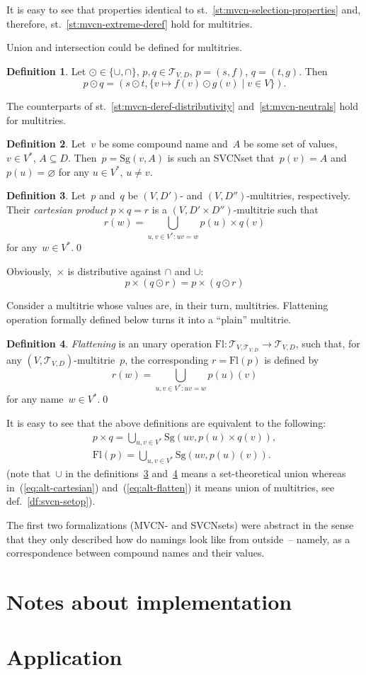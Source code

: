 \documentclass{article}
\theoremstyle{definition}
\newtheorem{Df}{Definition}
\newcommand{\setcharmt}{T}
\newcommand{\setsymbol}[3]{\mathcal{#1}_{#2,#3}}
\newcommand{\setmt}[2]{\setsymbol{\setcharmt}{#1}{#2}}
\newcommand{\flatten}{\mathrm{Fl}}
\newcommand{\singleleaf}{\mathrm{Sg}}
\begin{document}
It is easy to see that properties identical to
st.~\ref{st:mvcn-selection-properties} and, therefore,
st.~\ref{st:mvcn-extreme-deref} hold for multitries.

Union and intersection could be defined for multitries.
\begin{Df}\label{df:mt-setop}
Let $\odot \in \{ \cup, \cap \}$, $p, q \in \setmt{V}{D}$,
$p = (s,f)$, $q = (t, g)$. Then
\[
  p \odot q = (s \odot t, \{ v \mapsto f(v) \odot g(v) \mid v \in V \}) .
\]
\end{Df}

The counterparts of st.~\ref{st:mvcn-deref-distributivity}
and~\ref{st:mvcn-neutrals} hold for multitries.


\begin{Df}
Let~$v$ be some compound name and~$A$ be some set of values, $v\in V^\ast$,
$A\subseteq D$.  Then~$p = \singleleaf(v,A)$ is such an SVCNset that~$p(v) =
A$ and~$p(u) = \varnothing$ for any $u\in V^\ast$, $u\neq v$.
\end{Df}

\begin{Df}\label{df:cartesian}
Let~$p$ and~$q$ be $(V,D')$- and $(V,D'')$-multitries, respectively. Their
\emph{cartesian product} $p\times q = r$ is a $(V,D'\times D'')$-multitrie
such that
\[
  r(w) = \bigcup_{u,v\in V^\ast: uv = w} p(u) \times q(v)
\]
for any~$w\in V^\ast$.\qed
\end{Df}

Obviously,~$\times$ is distributive against $\cap$ and $\cup$:
\[
  p\times(q\odot r) = p\times(q\odot r)
\]

Consider a multitrie whose values are, in their turn, multitries.
Flattening operation formally defined below turns it into a ``plain'' multitrie.
\begin{Df}\label{df:flatten}
\emph{Flattening} is an unary operation $\flatten : \setmt{V}{\setmt{V}{D}}
\to\setmt{V}{D}$, such that, for any $(V,\setmt{V}{D})$-multitrie~$p$, the
corresponding $r=\flatten(p)$ is defined by
\[
  r(w) = \bigcup_{u,v\in V^\ast: uv = w} p(u)(v)
\]
for any name~$w\in V^\ast$.\qed
\end{Df}

It is easy to see that the above definitions are equivalent to the following:
\begin{eqnarray}
  \label{eq:alt-cartesian}
  p\times q =
    \bigcup_{u,v\in V^\ast} \singleleaf(uv, p(u) \times q(v)) ,\\
  \label{eq:alt-flatten}
  \flatten(p) =
    \bigcup_{u,v\in V^\ast} \singleleaf(uv, p(u)(v)) .
\end{eqnarray}
(note that~$\cup$ in the definitions~\ref{df:cartesian} and~\ref{df:flatten}
means a set-theoretical union whereas in~(\ref{eq:alt-cartesian})
and~(\ref{eq:alt-flatten}) it means union of multitries, see
def.~\ref{df:svcn-setop}).

The first two formalizations (MVCN- and SVCNsets) were abstract in the sense
that they only described how do namings look like from outside~-- namely, as a
correspondence between compound names and their values.

\section{Notes about implementation}

\section{Application}
\end{document}
